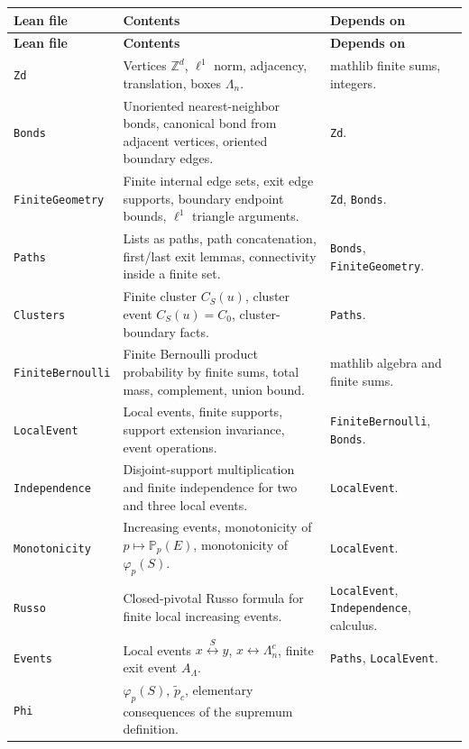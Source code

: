 \documentclass[11pt]{article}
\newcommand{\Z}{\mathbb Z}
\newcommand{\PP}{\mathbb P}
\newcommand{\conn}{\longleftrightarrow}
\newcommand{\ptilde}{\widetilde p_c}
\newcommand{\Lam}{\Lambda}
\theoremstyle{definition}
\theoremstyle{plain}
\begin{document}
{\small
\begin{longtable}{p{}p{}p{}}
\toprule
\textbf{Lean file} & \textbf{Contents} & \textbf{Depends on}\\
\midrule
\endfirsthead
\toprule
\textbf{Lean file} & \textbf{Contents} & \textbf{Depends on}\\
\midrule
\endhead
\texttt{Zd}
& Vertices $\Z^d$, $\ell^1$ norm, adjacency, translation, boxes $\Lam_n$.
& mathlib finite sums, integers.\\
\addlinespace
\texttt{Bonds}
& Unoriented nearest-neighbor bonds, canonical bond from adjacent vertices, oriented boundary edges.
& \texttt{Zd}.\\
\addlinespace
\texttt{FiniteGeometry}
& Finite internal edge sets, exit edge supports, boundary endpoint bounds, $\ell^1$ triangle arguments.
& \texttt{Zd}, \texttt{Bonds}.\\
\addlinespace
\texttt{Paths}
& Lists as paths, path concatenation, first/last exit lemmas, connectivity inside a finite set.
& \texttt{Bonds}, \texttt{FiniteGeometry}.\\
\addlinespace
\texttt{Clusters}
& Finite cluster $C_S(u)$, cluster event $C_S(u)=C_0$, cluster-boundary facts.
& \texttt{Paths}.\\
\addlinespace
\texttt{FiniteBernoulli}
& Finite Bernoulli product probability by finite sums, total mass, complement, union bound.
& mathlib algebra and finite sums.\\
\addlinespace
\texttt{LocalEvent}
& Local events, finite supports, support extension invariance, event operations.
& \texttt{FiniteBernoulli}, \texttt{Bonds}.\\
\addlinespace
\texttt{Independence}
& Disjoint-support multiplication and finite independence for two and three local events.
& \texttt{LocalEvent}.\\
\addlinespace
\texttt{Monotonicity}
& Increasing events, monotonicity of $p\mapsto\PP_p(E)$, monotonicity of $\varphi_p(S)$.
& \texttt{LocalEvent}.\\
\addlinespace
\texttt{Russo}
& Closed-pivotal Russo formula for finite local increasing events.
& \texttt{LocalEvent}, \texttt{Independence}, calculus.\\
\addlinespace
\texttt{Events}
& Local events $x\stackrel{S}{\conn}y$, $x\conn\Lam_n^c$, finite exit event $A_\Lam$.
& \texttt{Paths}, \texttt{LocalEvent}.\\
\addlinespace
\texttt{Phi}
& $\varphi_p(S)$, $\ptilde$, elementary consequences of the supremum definition.

\end{longtable}}
\end{document}
